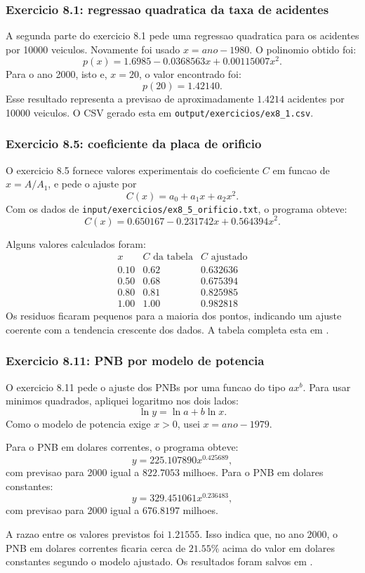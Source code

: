 \documentclass[../main.tex]{subfiles}
\begin{document}
\subsubsection{Exercicio 8.1: regressao quadratica da taxa de acidentes}

A segunda parte do exercicio 8.1 pede uma regressao quadratica para os acidentes
por 10000 veiculos. Novamente foi usado \(x = ano - 1980\). O polinomio obtido
foi:
\[
    p(x) = 1.6985 - 0.0368563x + 0.00115007x^2.
\]
Para o ano 2000, isto e, \(x=20\), o valor encontrado foi:
\[
    p(20) = 1.42140.
\]
Esse resultado representa a previsao de aproximadamente \(1.4214\) acidentes por
10000 veiculos. O CSV gerado esta em
\texttt{output/exercicios/ex8\_1.csv}.

\subsubsection{Exercicio 8.5: coeficiente da placa de orificio}

O exercicio 8.5 fornece valores experimentais do coeficiente \(C\) em funcao de
\(x=A/A_1\), e pede o ajuste por
\[
    C(x) = a_0 + a_1x + a_2x^2.
\]
Com os dados de \texttt{input/exercicios/ex8\_5\_orificio.txt}, o programa
obteve:
\[
    C(x) = 0.650167 - 0.231742x + 0.564394x^2.
\]

Alguns valores calculados foram:
\[
\begin{array}{c|c|c}
x & C\text{ da tabela} & C\text{ ajustado} \\
\hline
0.10 & 0.62 & 0.632636 \\
0.50 & 0.68 & 0.675394 \\
0.80 & 0.81 & 0.825985 \\
1.00 & 1.00 & 0.982818
\end{array}
\]
Os residuos ficaram pequenos para a maioria dos pontos, indicando um ajuste
coerente com a tendencia crescente dos dados. A tabela completa esta em
.

\subsubsection{Exercicio 8.11: PNB por modelo de potencia}

O exercicio 8.11 pede o ajuste dos PNBs por uma funcao do tipo \(a x^b\). Para
usar minimos quadrados, apliquei logaritmo nos dois lados:
\[
    \ln y = \ln a + b\ln x.
\]
Como o modelo de potencia exige \(x>0\), usei \(x=ano-1979\).

Para o PNB em dolares correntes, o programa obteve:
\[
    y = 225.107890x^{0.425689},
\]
com previsao para 2000 igual a \(822.7053\) milhoes. Para o PNB em dolares
constantes:
\[
    y = 329.451061x^{0.236483},
\]
com previsao para 2000 igual a \(676.8197\) milhoes.

A razao entre os valores previstos foi \(1.21555\). Isso indica que, no ano
2000, o PNB em dolares correntes ficaria cerca de \(21.55\%\) acima do valor em
dolares constantes segundo o modelo ajustado. Os resultados foram salvos em
.
\end{document}
